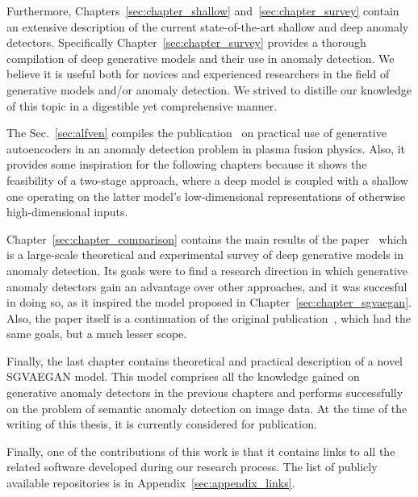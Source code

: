 Furthermore, Chapters~\ref{sec:chapter_shallow} and~\ref{sec:chapter_survey} contain an extensive description of the current state-of-the-art shallow and deep anomaly detectors. Specifically Chapter~\ref{sec:chapter_survey} provides a thorough compilation of deep generative models and their use in anomaly detection. We believe it is useful both for novices and experienced researchers in the field of generative models and/or anomaly detection. We strived to distille our knowledge of this topic in a digestible yet comprehensive manner.

The Sec.~\ref{sec:alfven} compiles the publication~\cite{vskvara2020detection} on practical use of generative autoencoders in an anomaly detection problem in plasma fusion physics. Also, it provides some inspiration for the following chapters because it shows the feasibility of a two-stage approach, where a deep model is coupled with a shallow one operating on the latter model's low-dimensional representations of otherwise high-dimensional inputs.

Chapter~\ref{sec:chapter_comparison} contains the main results of the paper~\cite{vskvara2021comparison} which is a large-scale theoretical and experimental survey of deep generative models in anomaly detection. Its goals were to find a research direction in which generative anomaly detectors gain an advantage over other approaches, and it was succesful in doing so, as it inspired the model proposed in Chapter~\ref{sec:chapter_sgvaegan}. Also, the paper itself is a continuation of the original publication~\cite{vskvara2018generative}, which had the same goals, but a much lesser scope.

Finally, the last chapter contains theoretical and practical description of a novel SGVAEGAN model. This model comprises all the knowledge gained on generative anomaly detectors in the previous chapters and performs successfully on the problem of semantic anomaly detection on image data. At the time of the writing of this thesis, it is currently considered for publication.

Finally, one of the contributions of this work is that it contains links to all the related software developed during our research process. The list of publicly available repositories is in Appendix~\ref{sec:appendix_links}.

